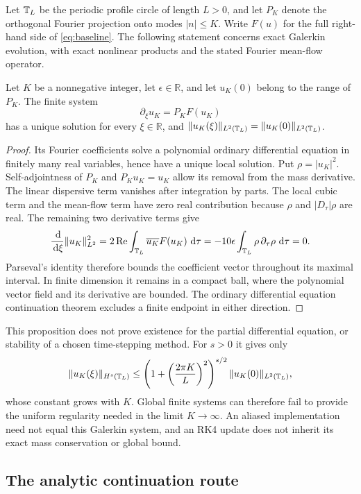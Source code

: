 Let $\mathbb T_L$ be the periodic profile circle of length $L>0$, and let $P_K$
denote the orthogonal Fourier projection onto modes $|n|\leq K$.
Write $F(u)$ for the full right-hand side of \eqref{eq:baseline}.
The following statement concerns exact Galerkin evolution, with exact
nonlinear products and the stated Fourier mean-flow operator.

\begin{proposition}
\label{prop:galerkin-global}
Let $K$ be a nonnegative integer, let $\epsilon\in\mathbb R$, and let
$u_K(0)$ belong to the range of $P_K$. The finite system
\[
  \partial_\xi u_K=P_KF(u_K)
\]
has a unique solution for every $\xi\in\mathbb R$, and
$\lVert u_K(\xi)\rVert_{L^2(\mathbb T_L)}=\lVert u_K(0)\rVert_{L^2(\mathbb T_L)}$.
\end{proposition}
\begin{proof}
Its Fourier coefficients solve a polynomial ordinary differential
equation in finitely many real variables, hence have a unique local
solution. Put $\rho=|u_K|^2$. Self-adjointness of $P_K$ and $P_Ku_K=u_K$
allow its removal from the mass derivative. The linear dispersive term
vanishes after integration by parts. The local cubic term and the mean-flow
term have zero real contribution because $\rho$ and $|D_\tau|\rho$ are real.
The remaining two derivative terms give
\[
 \frac{\,\mathrm d}{\,\mathrm d\xi}\lVert u_K\rVert_{L^2}^2
 =2\operatorname{Re}\int_{\mathbb T_L}\overline{u_K}F(u_K)\,\,\mathrm d\tau
 =-10\epsilon\int_{\mathbb T_L}\rho\,\partial_\tau\rho\,\,\mathrm d\tau=0.
\]
Parseval's identity therefore bounds the coefficient vector throughout
its maximal interval. In finite dimension it remains in a compact ball,
where the polynomial vector field and its derivative are bounded.
The ordinary differential equation continuation theorem excludes a finite
endpoint in either direction.
\end{proof}

This proposition does not prove existence for the partial differential
equation, or stability of a chosen time-stepping method. For $s>0$ it gives
only
\[
 \lVert u_K(\xi)\rVert_{H^s(\mathbb T_L)}
 \leq\left(1+\left(\frac{2\pi K}{L}\right)^2\right)^{s/2}
       \lVert u_K(0)\rVert_{L^2(\mathbb T_L)},
\]
whose constant grows with $K$. Global finite systems can therefore fail
to provide the uniform regularity needed in the limit $K\to\infty$.
An aliased implementation need not equal this Galerkin system, and an
RK4 update does not inherit its exact mass conservation or global bound.

\subsection{The analytic continuation route}

